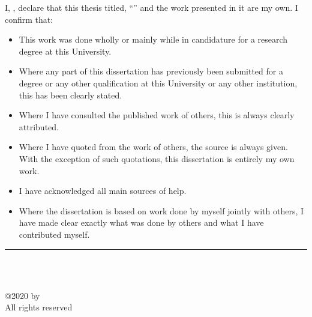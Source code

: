 \documentclass[
11pt, 
oneside,
english,
onehalfspacing,
onehalfspacing,
parskip,
headsepline,
]{MastersDoctoralThesis}
\begin{document}
\begin{declaration}
\noindent I, \authorname, declare that this thesis titled, \enquote{\ttitle} and the work presented in it are my own. I confirm that:

\begin{itemize} 
\item This work was done wholly or mainly while in candidature for a research degree at this University.
\item	Where any part of this dissertation has previously been submitted for a degree or any other qualification at this University or any other institution, this has been clearly stated.
\item	Where I have consulted the published work of others, this is always clearly attributed.
\item	Where I have quoted from the work of others, the source is always given. With the exception of such quotations, this dissertation is entirely my own work.
\item	I have acknowledged all main sources of help.
\item	Where the dissertation is based on work done by myself jointly with others, I have made clear exactly what was done by others and what I have contributed myself.
\\
\end{itemize}

\bigskip 

\begin{flushright}
\noindent \rule[0.0em]{15em}{0.5pt}\\ %
\authorname\\
\examDate
\end{flushright}

\vfill

\begin{center}
@2020 by \authorname\\
All rights reserved
\end{center}

\end{declaration}

\cleardoublepage

%
%
%
%
\end{document}
